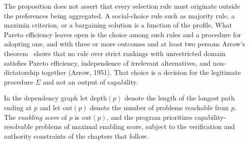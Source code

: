 \begin{remark}
The proposition does not assert that every selection rule must originate outside the preferences being aggregated. A social-choice rule such as majority rule, a maximin criterion, or a bargaining solution is a function of the profile. What Pareto efficiency leaves open is the choice among such rules and a procedure for adopting one, and with three or more outcomes and at least two persons Arrow's theorem~\cite{arrow1951} shows that no rule over strict rankings with unrestricted domain satisfies Pareto efficiency, independence of irrelevant alternatives, and non-dictatorship together (Arrow, 1951). That choice is a decision for the legitimate procedure $\Sigma$ and not an output of capability.
\end{remark}

In the dependency graph let $\mathrm{depth}(p)$ denote the length of the longest path ending at $p$ and let $\mathrm{out}(p)$ denote the number of problems reachable from $p$. The \emph{enabling score} of $p$ is $\mathrm{out}(p)$, and the program prioritizes capability-resolvable problems of maximal enabling score, subject to the verification and authority constraints of the chapters that follow.
